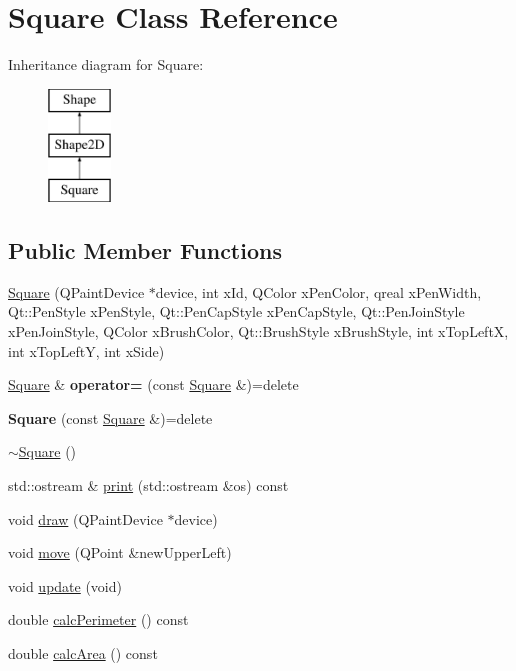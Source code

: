 \hypertarget{classSquare}{\section{Square Class Reference}
\label{classSquare}
}
Inheritance diagram for Square\-:\begin{figure}[H]
\begin{center}
\leavevmode
\includegraphics[height=3.000000cm]{classSquare}
\end{center}
\end{figure}
\subsection*{Public Member Functions}
\begin{DoxyCompactItemize}
\item 
\hyperlink{classSquare_aa8ee6128744d0bf3bc697c035acf4441}{Square} (Q\-Paint\-Device $\ast$device, int x\-Id, Q\-Color x\-Pen\-Color, qreal x\-Pen\-Width, Qt\-::\-Pen\-Style x\-Pen\-Style, Qt\-::\-Pen\-Cap\-Style x\-Pen\-Cap\-Style, Qt\-::\-Pen\-Join\-Style x\-Pen\-Join\-Style, Q\-Color x\-Brush\-Color, Qt\-::\-Brush\-Style x\-Brush\-Style, int x\-Top\-Left\-X, int x\-Top\-Left\-Y, int x\-Side)
\item 
\hypertarget{classSquare_abea50130b033d31a45d1ec4fa2c3aab6}{\hyperlink{classSquare}{Square} \& {\bfseries operator=} (const \hyperlink{classSquare}{Square} \&)=delete}\label{classSquare_abea50130b033d31a45d1ec4fa2c3aab6}

\item 
\hypertarget{classSquare_a0b76cd4153675ea610cd495a2eabbd65}{{\bfseries Square} (const \hyperlink{classSquare}{Square} \&)=delete}\label{classSquare_a0b76cd4153675ea610cd495a2eabbd65}

\item 
\hyperlink{classSquare_a90af7ce1060cff7b717ceddb333846b8}{$\sim$\-Square} ()
\item 
std\-::ostream \& \hyperlink{classSquare_af2b00ed5022d4eefcbafe31cc77535f6}{print} (std\-::ostream \&os) const 
\item 
void \hyperlink{classSquare_aa7119d995068a665c84712f1673cf413}{draw} (Q\-Paint\-Device $\ast$device)
\item 
void \hyperlink{classSquare_a90610398a48ef62bb9d948c37d2ec7cc}{move} (Q\-Point \&new\-Upper\-Left)
\item 
void \hyperlink{classSquare_acfd8a9b71e6cf950c34eb022cbe3ae11}{update} (void)
\item 
double \hyperlink{classSquare_adc4486c61e47855be176c4c38db7e2df}{calc\-Perimeter} () const 
\item 
double \hyperlink{classSquare_a203f54d90c5c3282579725ca8354d882}{calc\-Area} () const 
\end{DoxyCompactItemize}
